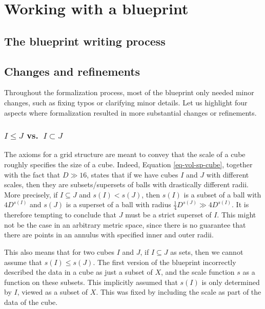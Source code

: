 \documentclass[12pt]{amsart}
\theoremstyle{definition}
\theoremstyle{plain}
\begin{document}
\section{Working with a blueprint}\label{sec:blueprint}
\subsection{The blueprint writing process}\label{subsec:blueprint_writing}

\subsection{Changes and refinements}\label{subsec:blueprint_changes}

Throughout the formalization process, most of the blueprint only needed minor changes, such as fixing typos or clarifying minor details. Let us highlight four aspects where formalization resulted in more substantial changes or refinements.

\subsubsection{$I \leq J$ vs.\ $I \subset J$}
The axioms for a grid structure are meant to convey that the scale of a cube roughly specifies the size of a cube.
Indeed, Equation \eqref{eq-vol-sp-cube}, together with the fact that $D\gg 16$,
states that if we have cubes $I$ and $J$ with different scales, then they are subsets/supersets of balls with drastically different radii.
More precisely, if $I\subseteq J$ and $s(I)<s(J)$,
then $s(I)$ is a subset of a ball with $4D^{s(I)}$
and $s(J)$ is a superset of a ball with radius $\frac{1}{4}D^{s(J)}\gg 4D^{s(I)}$.
It is therefore tempting to conclude that $J$ must be a strict superset of $I$.
This might not be the case in an arbitrary metric space,
since there is no guarantee that there are points
in an annulus with specified inner and outer radii.

This also means that for two cubes $I$ and $J$, if $I\subseteq J$ as sets,
then we cannot assume that $s(I)\le s(J)$.
The first version of the blueprint incorrectly described the data in a cube as just a subset of $X$,
and the scale function $s$ as a function on these subsets.
This implicitly assumed that $s(I)$ is only determined by $I$, viewed as a subset of $X$.
This was fixed by including the scale as part of the data of the cube.
\end{document}
